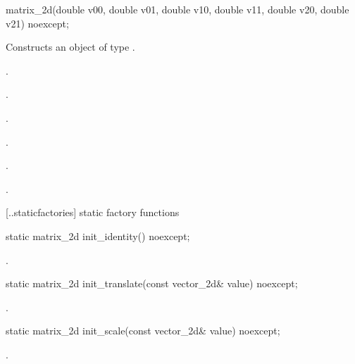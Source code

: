 \begin{itemdecl}
    matrix_2d(double v00, double v01, double v10, double v11,
      double v20, double v21) noexcept;
\end{itemdecl}
\begin{itemdescr}
	\pnum
	\effects
	Constructs an object of type .
	
	\pnum
	\postconditions
	.
	
	\pnum
	.
	
	\pnum
	.
	
	\pnum
	.
	
	\pnum
	.
	
	\pnum
	.
	
\end{itemdescr}

 [\iotwod.\matrixtwod.staticfactories] { static factory 
functions}

\begin{itemdecl}
static matrix_2d init_identity() noexcept;
\end{itemdecl}
\begin{itemdescr}
	\pnum
	\returns
	.
\end{itemdescr}

\begin{itemdecl}
static matrix_2d init_translate(const vector_2d& value) noexcept;
\end{itemdecl}
\begin{itemdescr}
	\pnum
	\returns
	.
\end{itemdescr}

\begin{itemdecl}
static matrix_2d init_scale(const vector_2d& value) noexcept;
\end{itemdecl}
\begin{itemdescr}
	\pnum
	\returns
	.
\end{itemdescr}

